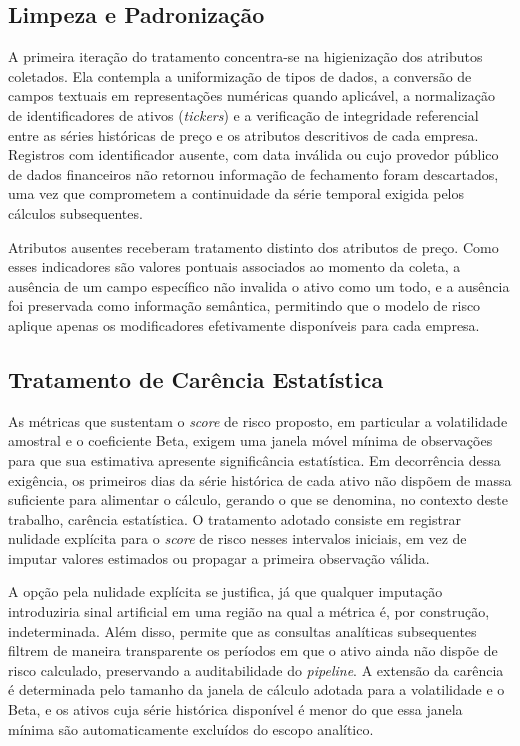 \subsection{Limpeza e Padronização}

A primeira iteração do tratamento concentra-se na higienização dos atributos coletados. Ela contempla a uniformização de tipos de dados, a conversão de campos textuais em representações numéricas quando aplicável, a normalização de identificadores de ativos (\textit{tickers}) e a verificação de integridade referencial entre as séries históricas de preço e os atributos descritivos de cada empresa. Registros com identificador ausente, com data inválida ou cujo provedor público de dados financeiros não retornou informação de fechamento foram descartados, uma vez que comprometem a continuidade da série temporal exigida pelos cálculos subsequentes.

Atributos ausentes receberam tratamento distinto dos atributos de preço. Como esses indicadores são valores pontuais associados ao momento da coleta, a ausência de um campo específico não invalida o ativo como um todo, e a ausência foi preservada como informação semântica, permitindo que o modelo de risco aplique apenas os modificadores efetivamente disponíveis para cada empresa.

\subsection{Tratamento de Carência Estatística}

As métricas que sustentam o \textit{score} de risco proposto, em particular a volatilidade amostral e o coeficiente Beta, exigem uma janela móvel mínima de observações para que sua estimativa apresente significância estatística. Em decorrência dessa exigência, os primeiros dias da série histórica de cada ativo não dispõem de massa suficiente para alimentar o cálculo, gerando o que se denomina, no contexto deste trabalho, carência estatística. O tratamento adotado consiste em registrar nulidade explícita para o \textit{score} de risco nesses intervalos iniciais, em vez de imputar valores estimados ou propagar a primeira observação válida.

A opção pela nulidade explícita se justifica, já que qualquer imputação introduziria sinal artificial em uma região na qual a métrica é, por construção, indeterminada. Além disso, permite que as consultas analíticas subsequentes filtrem de maneira transparente os períodos em que o ativo ainda não dispõe de risco calculado, preservando a auditabilidade do \textit{pipeline}. A extensão da carência é determinada pelo tamanho da janela de cálculo adotada para a volatilidade e o Beta, e os ativos cuja série histórica disponível é menor do que essa janela mínima são automaticamente excluídos do escopo analítico.

